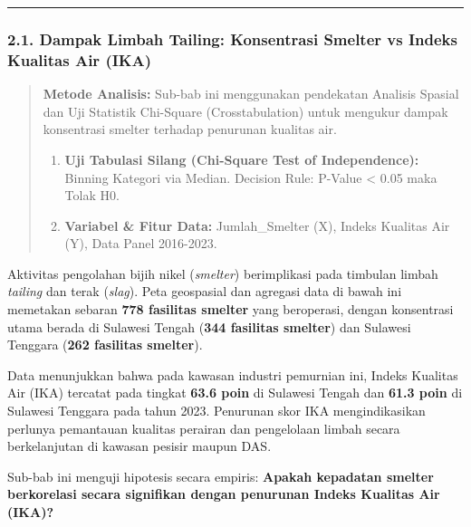 \documentclass[
]{article}
\providecommand{\tightlist}{%
  \setlength{\itemsep}{0pt}\setlength{\parskip}{0pt}}
\begin{document}
\begin{center}\rule{0.5\linewidth}{0.5pt}\end{center}

\subsubsection{2.1. Dampak Limbah Tailing: Konsentrasi Smelter vs Indeks
Kualitas Air
(IKA)}\label{dampak-limbah-tailing-konsentrasi-smelter-vs-indeks-kualitas-air-ika}

\begin{quote}
\textbf{Metode Analisis:} Sub-bab ini menggunakan pendekatan Analisis
Spasial dan Uji Statistik Chi-Square (Crosstabulation) untuk mengukur
dampak konsentrasi smelter terhadap penurunan kualitas air.

\begin{enumerate}
\def\labelenumi{\arabic{enumi}.}
\tightlist
\item
  \textbf{Uji Tabulasi Silang (Chi-Square Test of Independence):}
  Binning Kategori via Median. Decision Rule: P-Value \textless{} 0.05
  maka Tolak H0.
\item
  \textbf{Variabel \& Fitur Data:} Jumlah\_Smelter (X), Indeks Kualitas
  Air (Y), Data Panel 2016-2023.
\end{enumerate}
\end{quote}

Aktivitas pengolahan bijih nikel (\emph{smelter}) berimplikasi pada
timbulan limbah \emph{tailing} dan terak (\emph{slag}). Peta geospasial
dan agregasi data di bawah ini memetakan sebaran \textbf{778 fasilitas
smelter} yang beroperasi, dengan konsentrasi utama berada di Sulawesi
Tengah (\textbf{344 fasilitas smelter}) dan Sulawesi Tenggara
(\textbf{262 fasilitas smelter}).

Data menunjukkan bahwa pada kawasan industri pemurnian ini, Indeks
Kualitas Air (IKA) tercatat pada tingkat \textbf{63.6 poin} di Sulawesi
Tengah dan \textbf{61.3 poin} di Sulawesi Tenggara pada tahun 2023.
Penurunan skor IKA mengindikasikan perlunya pemantauan kualitas perairan
dan pengelolaan limbah secara berkelanjutan di kawasan pesisir maupun
DAS.

Sub-bab ini menguji hipotesis secara empiris: \textbf{Apakah kepadatan
smelter berkorelasi secara signifikan dengan penurunan Indeks Kualitas
Air (IKA)?}
\end{document}
